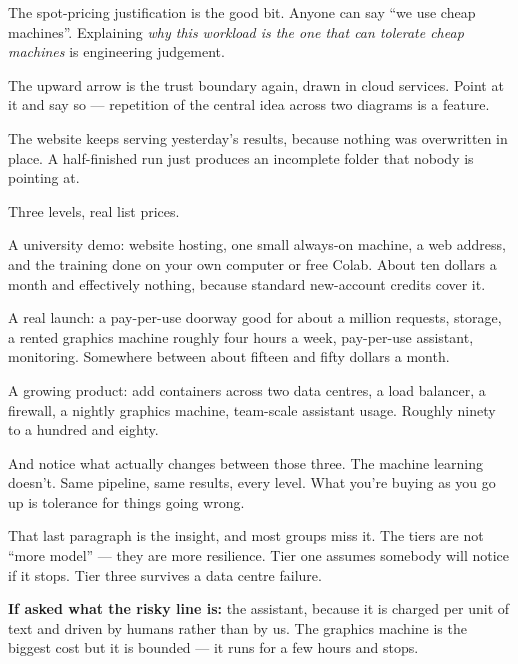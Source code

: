 \documentclass[11pt]{article}
\begin{document}
\begin{means}
The spot-pricing justification is the good bit. Anyone can say ``we use cheap
machines''. Explaining \emph{why this workload is the one that can tolerate
cheap machines} is engineering judgement.

The upward arrow is the trust boundary again, drawn in cloud services. Point at
it and say so --- repetition of the central idea across two diagrams is a
feature.
\end{means}

\begin{asked}
 The website keeps serving
yesterday's results, because nothing was overwritten in place. A half-finished
run just produces an incomplete folder that nobody is pointing at.
\end{asked}


\begin{saythis}
Three levels, real list prices.

A university demo: website hosting, one small always-on machine, a web address,
and the training done on your own computer or free Colab. About ten dollars a
month \bt and effectively nothing, because standard new-account credits cover
it.

A real launch: a pay-per-use doorway good for about a million requests,
storage, a rented graphics machine roughly four hours a week, pay-per-use
assistant, monitoring. Somewhere between about fifteen and fifty dollars a
month.

A growing product: add containers across two data centres, a load balancer, a
firewall, a nightly graphics machine, team-scale assistant usage. Roughly
ninety to a hundred and eighty.

And notice what actually changes between those three. The machine learning
doesn't. Same pipeline, same results, every level. What you're buying as you go
up is tolerance for things going wrong.
\end{saythis}

\begin{means}
That last paragraph is the insight, and most groups miss it. The tiers are not
``more model'' --- they are more resilience. Tier one assumes somebody will
notice if it stops. Tier three survives a data centre failure.

\textbf{If asked what the risky line is:} the assistant, because it is charged
per unit of text and driven by humans rather than by us. The graphics machine
is the biggest cost but it is bounded --- it runs for a few hours and stops.
\end{means}
\end{document}
